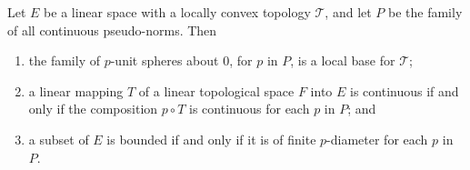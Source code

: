 Let $E$ be a linear space with a locally convex topology $\mathcal{T}$, and let $P$ be the family of all continuous pseudo-norms. Then
\begin{enumerate}
\item[(i)] the family of $p$-unit spheres about $0$, for $p$ in $P$, is a local base for $\mathcal{T}$;
\item[(iii)] a linear mapping $T$ of a linear topological space $F$ into $E$ is continuous if and only if the composition $p \circ T$ is continuous for each $p$ in $P$; and
\item[(iv)] a subset of $E$ is bounded if and only if it is of finite $p$-diameter for each $p$ in $P$.
\end{enumerate}
